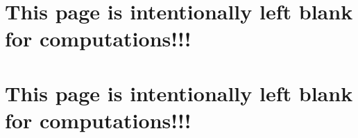 \documentclass[10pt, addpoints]{exam}
\theoremstyle{definition}
\begin{document}
\section*{This page is intentionally left blank for computations!!!}

\newpage
\section*{This page is intentionally left blank for computations!!!}
%
\end{document}
